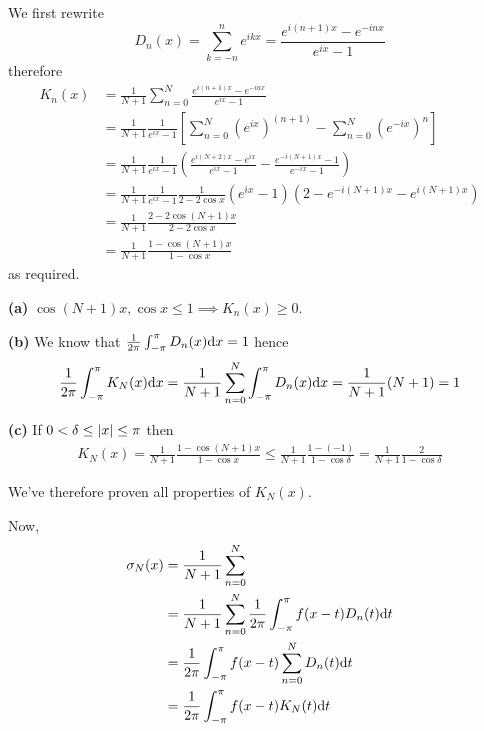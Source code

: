 \documentclass[a4paper, 12pt]{article}
\begin{document}
\begin{solution}
    We first rewrite 
    \begin{equation*}
        D_n(x) = \sum_{k=-n}^{n} e^{ikx} = \frac{e^{i(n+1)x} - e^{-inx}}{e^{ix} - 1}
    \end{equation*}
    therefore \begin{align*}
        K_n(x) &= \frac{1}{N+1 } \sum_{n=0}^{N} \frac{e^{i(n+1)x} - e^{-inx}}{e^{ix} - 1} \\
        &=\frac{1}{N+1 } \frac{1}{e^{ix} - 1} \left[\sum_{n=0}^{N} (e^{ix})^{(n+1)} - \sum_{n=0}^{N} (e^{-ix})^n\right] \\
        &=\frac{1}{N+1 } \frac{1}{e^{ix} - 1} \left(\frac{e^{i(N+2)x} - e^{ix}}{e^{ix} - 1} - \frac{e^{-i(N+1)x} - 1}{e^{-ix} - 1}\right) \\
        &=\frac{1}{N+1 } \frac{1}{e^{ix} - 1} \frac{1}{2 - 2\cos x} (e^{ix} - 1) (2 - e^{-i(N+1)x} - e^{i(N+1)x}) \\
        &=\frac{1}{N+1 } \frac{2 - 2 \cos (N+1) x}{2 - 2 \cos x} \\
        &=\frac{1}{N+1 } \frac{1 - \cos(N+1) x}{ 1 - \cos x}
    \end{align*}
    as required.

    \textbf{(a)} $\cos(N+1) x, \cos x \leq 1 \implies K_n(x) \geq 0$.

    \textbf{(b)} We know that $\frac{1}{2\pi}\int_{-\pi}^{\pi} D_n(x) \mathrm{d} x = 1$ hence \begin{equation*}
    \frac{1}{2\pi} \int_{-\pi}^{\pi} K_N(x) \mathrm{d} x = \frac{1}{N+1} \sum_{n=0}^{N} \int_{-\pi}^{\pi} D_n(x) \mathrm{d} x = \frac{1}{N+1} (N+1) = 1
    \end{equation*}

    \textbf{(c)} If $0 < \delta \leq \lvert x\rvert \leq \pi$ then \begin{align*}
        K_N(x) = \frac{1}{N+1} \frac{1 - \cos(N+1)x}{1 - \cos x} \leq \frac{1}{N+1} \frac{1 - (-1)}{1 - \cos \delta} = \frac{1}{N+1} \frac{2}{1 - \cos \delta}
    \end{align*}

    We've therefore proven all properties of $K_N(x)$.

    Now, \begin{align*}
    \sigma_N(x) &= \frac{1}{N+1} \sum_{n=0}^{N}\\
    &= \frac{1}{N+1} \sum_{n=0}^{N} \frac{1}{2\pi} \int_{-\pi}^{\pi} f(x - t) D_n(t) \mathrm{d} t \\
    &= \frac{1}{2\pi} \int_{-\pi}^{\pi} f(x - t) \sum_{n=0}^{N} D_n(t) \mathrm{d} t \\
    &=\frac{1}{2\pi} \int_{-\pi}^{\pi} f(x-t) K_N(t) \mathrm{d} t
    \end{align*}
    

\end{solution}
\end{document}
